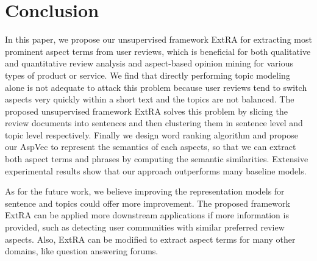 \section{Conclusion}

In this paper, we propose our unsupervised framework ExtRA for extracting most prominent aspect terms from user reviews, 
which is beneficial for both qualitative and quantitative review 
analysis and aspect-based opinion mining for various types of product or service. 
We find that directly performing topic modeling alone is not adequate to attack this problem because user reviews tend to
switch aspects very quickly within a short text and the topics are not balanced. 
The proposed unsupervised framework ExtRA solves this problem by slicing
the review documents into sentences and then clustering them in sentence level and 
topic level respectively. 
Finally we design word ranking algorithm and propose our AspVec to represent 
the semantics of each aspects, so that we can extract both aspect terms and phrases by 
computing the semantic similarities.
Extensive experimental results show that our approach
outperforms many baseline models.

As for the future work, we believe improving the representation models for sentence and topics could offer more improvement.
The proposed framework ExtRA can be applied more downstream applications if more information is provided, such as detecting user communities with similar preferred review aspects. 
Also, ExtRA  can be modified to extract aspect terms for many other domains, like question answering forums.
% 
